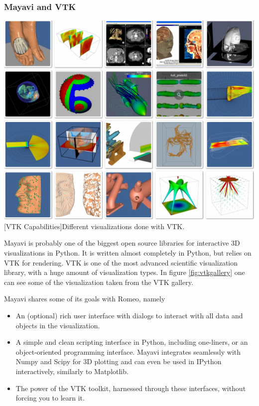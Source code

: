 \subsubsection{Mayavi and VTK}
\vspace{1em}
\begin{minipage}{\linewidth}
    \centering
    \includegraphics[width=0.9\linewidth]{graphics/vtk.jpg}
    [VTK Capabilities]{Different visualizations done with VTK.}
    \label{fig:vtkgallery}
\end{minipage}

Mayavi\cite{DBLP:journals/corr/abs-1010-4891} is probably one of the biggest open source libraries for interactive 3D visualizations in Python.
It is written almost completely in Python, but relies on \ac{VTK} for rendering.
\ac{VTK} is one of the most advanced scientific visualization library, with a huge amount of visualization types. 
In figure \ref{fig:vtkgallery} one can see some of the visualization taken from the \ac{VTK} gallery\cite{VTKGallery}.

Mayavi shares some of its goals with Romeo, namely\cite{MayaviGoals}
\begin{itemize}
	\item An (optional) rich user interface with dialogs to interact with all data and objects in the visualization.
	\item A simple and clean scripting interface in Python, including one-liners, or an object-oriented programming interface. Mayavi integrates seamlessly with Numpy and Scipy for 3D plotting and can even be used in IPython interactively, similarly to Matplotlib.
	\item The power of the VTK toolkit, harnessed through these interfaces, without forcing you to learn it.
\end{itemize}

